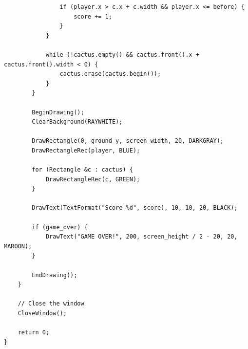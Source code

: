 \begin{verbatim}
                if (player.x > c.x + c.width && player.x <= before) {
                    score += 1;
                }
            }

            while (!cactus.empty() && cactus.front().x + cactus.front().width < 0) {
                cactus.erase(cactus.begin());
            }
        }

        BeginDrawing();
        ClearBackground(RAYWHITE);

        DrawRectangle(0, ground_y, screen_width, 20, DARKGRAY);
        DrawRectangleRec(player, BLUE);

        for (Rectangle &c : cactus) {
            DrawRectangleRec(c, GREEN);
        }

        DrawText(TextFormat("Score %d", score), 10, 10, 20, BLACK);

        if (game_over) {
            DrawText("GAME OVER!", 200, screen_height / 2 - 20, 20, MAROON);
        }

        EndDrawing();
    }

    // Close the window
    CloseWindow();

    return 0;
}
\end{verbatim}